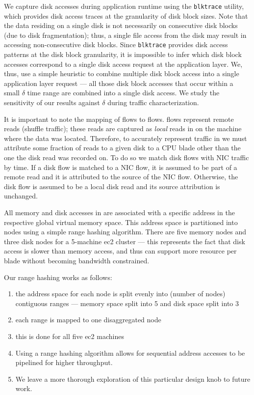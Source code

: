We capture disk accesses during application runtime using the {\tt blktrace} utility, which provides disk access traces at the granularity of disk block sizes. Note that the data residing on a single disk is not necessarily on consecutive disk blocks (due to disk fragmentation); thus, a single file access from the disk may result in accessing non-consecutive disk blocks. Since {\tt blktrace} provides disk access patterns at the disk block granularity, it is impossible to infer which disk block accesses correspond to a single disk access request at the application layer. We, thus, use a simple heuristic to combine multiple disk block access into a single application layer request --- all those disk block accesses that occur within a small $\delta$ time range are combined into a single disk access. We study the sensitivity of our results against $\delta$ during traffic characterization. 

 It is important to note the mapping of \pdis flows to \dis flows. \pdis flows represent remote reads (\ie shuffle traffic); these reads are captured as \emph{local} reads in \dis on the machine where the data was located. Therefore, to accurately represent traffic in \dis we must attribute some fraction of reads to a given disk to a CPU blade other than the one the disk read was recorded on. To do so we match disk flows with NIC traffic by time. If a disk flow is matched to a NIC flow, it is assumed to be part of a remote read and it is attributed to the source of the NIC flow. Otherwise, the disk flow is assumed to be a local disk read and its source attribution is unchanged.

All memory and disk accesses in \dis are associated with a specific address in the respective global virtual memory space. This address space is partitioned into nodes using a simple range hashing algorithm. There are five memory nodes and three disk nodes for a 5-machine ec2 cluster --- this represents the fact that disk access is slower than memory access, and thus can support more resource per blade without becoming bandwidth constrained.

Our range hashing works as follows: 
\begin{enumerate}
\item the address space for each node is split evenly into (number of nodes) contiguous ranges --- memory space split into 5 and disk space split into 3
\item each range is mapped to one disaggregated node
\item this is done for all five ec2 machines
\item Using a range hashing algorithm allows for sequential address accesses to be pipelined for higher throughput. 
\item We leave a more thorough exploration of this particular design knob to future work.
\end{enumerate}

